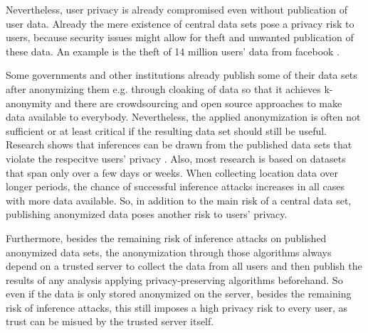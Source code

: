 Nevertheless, user privacy is already compromised even without publication of user data.
Already the mere existence of central data sets pose a privacy risk to users, because security issues might allow for theft and unwanted publication of these data.
An example is the theft of 14 million users' data from facebook \parencite{facebook}.

Some governments and other institutions already publish some of their data sets after anonymizing them e.g. through cloaking of data so that it achieves k-anonymity and there are crowdsourcing and open source approaches to make data available to everybody. 
Nevertheless, the applied anonymization is often not sufficient or at least critical if the resulting data set should still be useful. Research shows that inferences can be drawn from the published data sets that violate the respecitve users' privacy \parencite{cellphone, twitter}. Also, most research is based on datasets that span only over a few days or weeks. When collecting location data over longer periods, the chance of successful inference attacks increases in all cases with more data available. So, in addition to the main risk of a central data set, publishing anonymized data poses another risk to users' privacy.

Furthermore, besides the remaining risk of inference attacks on published anonymized data sets, the anonymization through those algorithms always depend on a trusted server to collect the data from all users and then publish the results of any analysis applying privacy-preserving algorithms beforehand. So even if the data is only stored anonymized on the server, besides the remaining risk of inference attacks, this still imposes a high privacy risk to every user, as trust can be misued by the trusted server itself.\\

